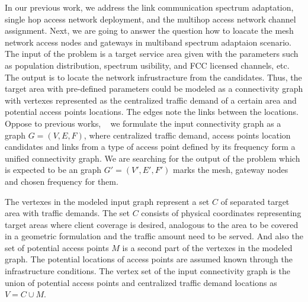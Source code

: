 

In our previous work, we address the link communication spectrum adaptation, 
single hop access network deployment, and the multihop access network channel
assignment. Next, we are going to answer the question how to loacate the mesh
network access nodes and gateways in multiband spectrum adaptaion scenario.
The input of the problem is a target service area given with the parameters 
such as population distribution, spectrum usibility, and FCC licensed channels, 
etc. The output is to locate the network infrustracture from the candidates.
Thus, the target area with pre-defined parameters could be modeled as a 
connectivity graph with vertexes represented as the centralized traffic demand 
of a certain area and potential access points locations. The edges note the 
links between the locations. Oppose to previous works,
~\cite{robinson2010deploying,franklin2007node,tang2005interference,irwin2013resource}
we formulate the input connectivity graph as a graph $G = (V,E,F)$, where centralized
traffic demand, access points location candidates and links from a type of access 
point defined by its frequency form a unified connectivity graph. 
We are searching for the output of the problem which is expected to be an graph 
$G' = (V',E',F')$ marks the mesh, gateway nodes and chosen frequency for them. 

The vertexes in the modeled input graph represent a set $C$ of  separated target 
area with traffic demands. The set $C$ consists of physical coordinates representing 
target areas where client coverage is desired, analogous to the area to be covered 
in a geometric formulation and the traffic amount need to be served. And also the 
set of potential access points $M$ is a second part of the vertexes in the modeled 
graph. The potential locations of access points are assumed known through the 
infrastructure conditions. The vertex set of the input connectivity graph is 
the union of potential access points and centralized traffic demand locations as 
$V = C\cup M$.


